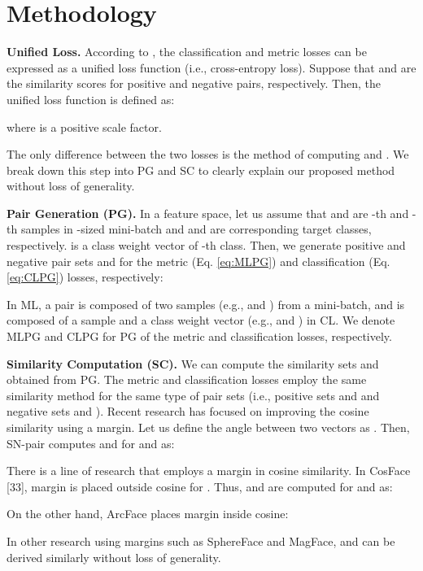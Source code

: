 \documentclass[10pt,twocolumn]{article}
\begin{document}
\section{Methodology}
\noindent\textbf{Unified Loss.} According to \cite{sun2020circle, sohn2016improved}, the classification and metric losses can be expressed as a unified loss function (i.e., cross-entropy loss). Suppose that  and  are the similarity scores for  positive and  negative pairs, respectively. Then, the unified loss function is defined as:


where  is a positive scale factor.

The only difference between the two losses is the method of computing  and . We break down this step into PG and SC to clearly explain our proposed method without loss of generality.  

\noindent\textbf{Pair Generation (PG).} In a feature space, let us assume that  and  are -th and -th samples in -sized mini-batch and  and  are corresponding target classes, respectively.  is a class weight vector of -th class. Then, we generate positive and negative pair sets  and  for the metric (Eq. \ref{eq:MLPG}) and classification (Eq. \ref{eq:CLPG}) losses, respectively:




In ML, a pair is composed of two samples (e.g.,  and ) from a mini-batch, and is composed of a sample and a class weight vector (e.g.,  and ) in CL. We denote MLPG and CLPG for PG of the metric and classification losses, respectively.  

\noindent\textbf{Similarity Computation (SC).} We can compute the similarity sets  and  obtained from PG. The metric and classification losses employ the same similarity method for the same type of pair sets (i.e., positive sets  and  and negative sets  and ). Recent research has focused on improving the cosine similarity using a margin. Let us define the angle between two vectors as . Then,  SN-pair\cite{jung2021mixface} computes  and  for  and  as: 




There is a line\cite{deng2019arcface, meng2021magface, wang2018cosface} of research that employs a margin in cosine similarity. In CosFace [33], margin  is placed outside cosine for . Thus,  and  are computed for  and  as:


On the other hand, ArcFace\cite{deng2019arcface} places margin  inside cosine: 

In other research using margins such as SphereFace\cite{liu2017sphereface} and MagFace\cite{meng2021magface},  and  can be derived similarly without loss of generality. 
\end{document}
